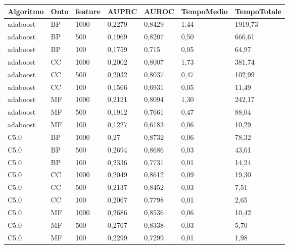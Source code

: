 \documentclass[12pt]{report}
\begin{document}
\begin{appendices}
\setlength\LTleft{-9mm}
\begin{longtable}[h]{|l|l|l|l|l|l|l|}
\hline
\textbf{Algoritmo}    & \textbf{Onto} & \textbf{feature} & \textbf{AUPRC}  & \textbf{AUROC}  & \textbf{TempoMedio} & \textbf{TempoTotale} \\ \hline
adaboost     & BP   & 1000    & 0,2279 & 0,8429 & 1,44            & 1919,73     \\ \hline
adaboost     & BP   & 500     & 0,1969 & 0,8207 & 0,50            & 666,61      \\ \hline
adaboost     & BP   & 100     & 0,1759 & 0,715  & 0,05            & 64,97       \\ \hline
adaboost     & CC   & 1000    & 0,2002 & 0,8007 & 1,73            & 381,74      \\ \hline
adaboost     & CC   & 500     & 0,2032 & 0,8037 & 0,47            & 102,99      \\ \hline
adaboost     & CC   & 100     & 0,1566 & 0,6931 & 0,05            & 11,49       \\ \hline
adaboost     & MF   & 1000    & 0,2121 & 0,8094 & 1,30            & 242,17      \\ \hline
adaboost     & MF   & 500     & 0,1912 & 0,7661 & 0,47            & 88,04       \\ \hline
adaboost     & MF   & 100     & 0,1227 & 0,6183 & 0,06            & 10,29       \\ \hline
C5.0         & BP   & 1000    & 0,27   & 0,8732 & 0,06            & 78,32       \\ \hline
C5.0         & BP   & 500     & 0,2694 & 0,8686 & 0,03            & 43,61       \\ \hline
C5.0         & BP   & 100     & 0,2336 & 0,7731 & 0,01            & 14,24       \\ \hline
C5.0         & CC   & 1000    & 0,2049 & 0,8612 & 0,09            & 19,30       \\ \hline
C5.0         & CC   & 500     & 0,2137 & 0,8452 & 0,03            & 7,51        \\ \hline
C5.0         & CC   & 100     & 0,2067 & 0,7798 & 0,01            & 2,65        \\ \hline
C5.0         & MF   & 1000    & 0,2686 & 0,8536 & 0,06            & 10,42       \\ \hline
C5.0         & MF   & 500     & 0,2767 & 0,8338 & 0,03            & 5,70        \\ \hline
C5.0         & MF   & 100     & 0,2299 & 0,7299 & 0,01            & 1,98        \\ \hline

\end{longtable}
\end{appendices}
\end{document}
